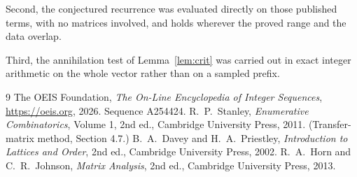 \documentclass[11pt,a4paper]{article}
\theoremstyle{plain}
\theoremstyle{definition}
\begin{document}
Second, the conjectured recurrence was evaluated directly on those published terms, with no
matrices involved, and holds wherever the proved range and the data overlap.

Third, the annihilation test of Lemma~\ref{lem:crit} was carried out in exact integer
arithmetic on the whole vector rather than on a sampled prefix.

\begin{thebibliography}{9}
 The OEIS Foundation, \emph{The On-Line Encyclopedia of Integer
Sequences}, \url{https://oeis.org}, 2026. Sequence A254424.
 R.~P.~Stanley, \emph{Enumerative Combinatorics}, Volume 1, 2nd ed.,
Cambridge University Press, 2011. (Transfer-matrix method, Section 4.7.)
 B.~A.~Davey and H.~A.~Priestley, \emph{Introduction to Lattices and
Order}, 2nd ed., Cambridge University Press, 2002.
 R.~A.~Horn and C.~R.~Johnson, \emph{Matrix Analysis}, 2nd ed., Cambridge
University Press, 2013.
\end{thebibliography}
\end{document}
